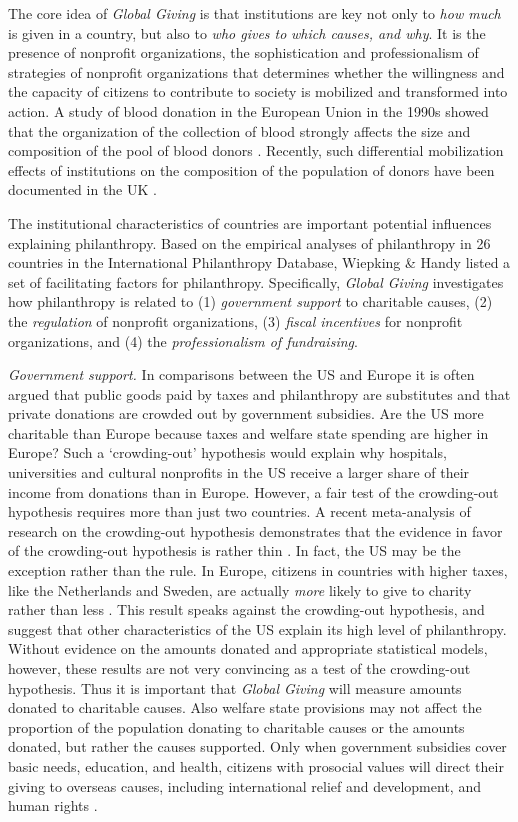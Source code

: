 \documentclass[twocolumn, serif, rga, numeric]{jote-article}
\begin{document}
The core idea of \emph{Global Giving} is that institutions are key not only to \emph{how much} is given in a country, but also to \emph{who gives to} \emph{which causes, and why}. It is the presence of nonprofit organizations, the sophistication and professionalism of strategies of nonprofit organizations that determines whether the willingness and the capacity of citizens to contribute to society is mobilized and transformed into action. A study of blood donation in the European Union in the 1990s showed that the organization of the collection of blood strongly affects the size and composition of the pool of blood donors \cite{Healy2000}. Recently, such differential mobilization effects of institutions on the composition of the population of donors have been documented in the UK \cite{Mohan2016}.

The institutional characteristics of countries are important potential influences explaining philanthropy. Based on the empirical analyses of philanthropy in 26 countries in the International Philanthropy Database, Wiepking \& Handy \cite{Wiepking2015} listed a set of facilitating factors for philanthropy. Specifically, \emph{Global Giving} investigates how philanthropy is related to (1) \emph{government support} to charitable causes, (2) the \emph{regulation} of nonprofit organizations, (3) \emph{fiscal incentives} for nonprofit organizations, and (4) the \emph{professionalism of fundraising}.

\emph{Government support.} In comparisons between the US and Europe it is often argued that public goods paid by taxes and philanthropy are substitutes and that private donations are crowded out by government subsidies. Are the US more charitable than Europe because taxes and welfare state spending are higher in Europe? Such a `crowding-out' hypothesis would explain why hospitals, universities and cultural nonprofits in the US receive a larger share of their income from donations than in Europe. However, a fair test of the crowding-out hypothesis requires more than just two countries. A recent meta-analysis of research on the crowding-out hypothesis demonstrates that the evidence in favor of the crowding-out hypothesis is rather thin \cite{deWit2016}. In fact, the US may be the exception rather than the rule. In Europe, citizens in countries with higher taxes, like the Netherlands and Sweden, are actually \emph{more} likely to give to charity rather than less \cite{Bekkers2015}. This result speaks against the crowding-out hypothesis, and suggest that other characteristics of the US explain its high level of philanthropy.
Without evidence on the amounts donated and appropriate statistical models, however, these results are not very convincing as a test of the crowding-out hypothesis. Thus it is important that \emph{Global Giving}
will measure amounts donated to charitable causes. Also welfare state provisions may not affect the proportion of the population donating to charitable causes or the amounts donated, but rather the causes supported. Only when government subsidies cover basic needs, education, and health, citizens with prosocial values will direct their giving to overseas causes, including international relief and development, and human rights \cite{Inglehart1977, Wiepking2010}.
\end{document}
